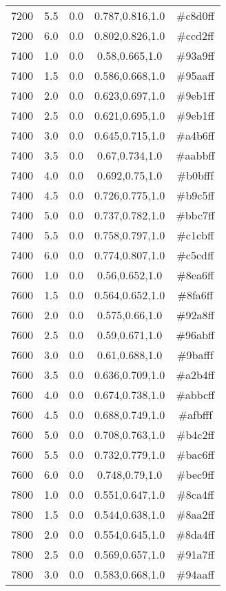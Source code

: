\begin{tabular}{ccccc}
7200 & 5.5 & 0.0 & 0.787,0.816,1.0 & \#c8d0ff \\ 
7200 & 6.0 & 0.0 & 0.802,0.826,1.0 & \#ccd2ff \\ 
7400 & 1.0 & 0.0 & 0.58,0.665,1.0 & \#93a9ff \\ 
7400 & 1.5 & 0.0 & 0.586,0.668,1.0 & \#95aaff \\ 
7400 & 2.0 & 0.0 & 0.623,0.697,1.0 & \#9eb1ff \\ 
7400 & 2.5 & 0.0 & 0.621,0.695,1.0 & \#9eb1ff \\ 
7400 & 3.0 & 0.0 & 0.645,0.715,1.0 & \#a4b6ff \\ 
7400 & 3.5 & 0.0 & 0.67,0.734,1.0 & \#aabbff \\ 
7400 & 4.0 & 0.0 & 0.692,0.75,1.0 & \#b0bfff \\ 
7400 & 4.5 & 0.0 & 0.726,0.775,1.0 & \#b9c5ff \\ 
7400 & 5.0 & 0.0 & 0.737,0.782,1.0 & \#bbc7ff \\ 
7400 & 5.5 & 0.0 & 0.758,0.797,1.0 & \#c1cbff \\ 
7400 & 6.0 & 0.0 & 0.774,0.807,1.0 & \#c5cdff \\ 
7600 & 1.0 & 0.0 & 0.56,0.652,1.0 & \#8ea6ff \\ 
7600 & 1.5 & 0.0 & 0.564,0.652,1.0 & \#8fa6ff \\ 
7600 & 2.0 & 0.0 & 0.575,0.66,1.0 & \#92a8ff \\ 
7600 & 2.5 & 0.0 & 0.59,0.671,1.0 & \#96abff \\ 
7600 & 3.0 & 0.0 & 0.61,0.688,1.0 & \#9bafff \\ 
7600 & 3.5 & 0.0 & 0.636,0.709,1.0 & \#a2b4ff \\ 
7600 & 4.0 & 0.0 & 0.674,0.738,1.0 & \#abbcff \\ 
7600 & 4.5 & 0.0 & 0.688,0.749,1.0 & \#afbfff \\ 
7600 & 5.0 & 0.0 & 0.708,0.763,1.0 & \#b4c2ff \\ 
7600 & 5.5 & 0.0 & 0.732,0.779,1.0 & \#bac6ff \\ 
7600 & 6.0 & 0.0 & 0.748,0.79,1.0 & \#bec9ff \\ 
7800 & 1.0 & 0.0 & 0.551,0.647,1.0 & \#8ca4ff \\ 
7800 & 1.5 & 0.0 & 0.544,0.638,1.0 & \#8aa2ff \\ 
7800 & 2.0 & 0.0 & 0.554,0.645,1.0 & \#8da4ff \\ 
7800 & 2.5 & 0.0 & 0.569,0.657,1.0 & \#91a7ff \\ 
7800 & 3.0 & 0.0 & 0.583,0.668,1.0 & \#94aaff \\ 

\end{tabular}
